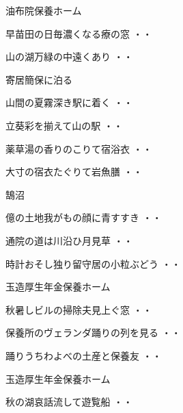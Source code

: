 \vspace{0.6cm}
油布院保養ホーム
\begin{shiika}早苗田の日毎濃くなる療の窓
\hfill{・・}\end{shiika}
\begin{shiika}山の湖万緑の中遠くあり
\hfill{・・}\end{shiika}
\vspace{0.6cm}
寄居簡保に泊る
\begin{shiika}山間の夏霧深き駅に着く
\hfill{・・}\end{shiika}
\begin{shiika}立葵彩を揃えて山の駅
\hfill{・・}\end{shiika}
\begin{shiika}薬草湯の香りのこりて宿浴衣
\hfill{・・}\end{shiika}
\begin{shiika}大寸の宿衣たぐりて岩魚膳
\hfill{・・}\end{shiika}
\vspace{0.6cm}
鵠沼
\begin{shiika}億の土地我がもの顔に青すすき
\hfill{・・}\end{shiika}
\begin{shiika}通院の道は川沿ひ月見草
\hfill{・・}\end{shiika}
\begin{shiika}時計おそし独り留守居の小粒ぶどう
\hfill{・・}\end{shiika}
\vspace{0.6cm}
玉造厚生年金保養ホーム
\begin{shiika}秋暑しビルの掃除夫見上ぐ窓
\hfill{・・}\end{shiika}
\begin{shiika}保養所のヴェランダ踊りの列を見る
\hfill{・・}\end{shiika}
\begin{shiika}踊りうちわよべの土産と保養友
\hfill{・・}\end{shiika}
\vspace{0.6cm}
玉造厚生年金保養ホーム
\begin{shiika}秋の湖哀話流して遊覧船
\hfill{・・}\end{shiika}
